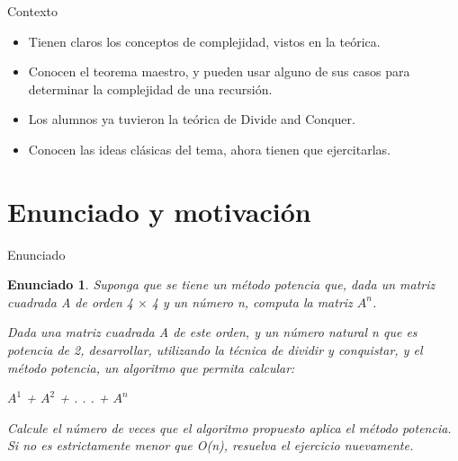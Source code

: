 \documentclass[pdf]{beamer}
\newtheorem{enun}{Enunciado}
\begin{document}
\begin{frame}{Contexto}
    \begin{itemize}
        \item{Tienen claros los conceptos de complejidad, vistos 
        en la teórica.}
        \vspace{2em}
        
        \item{Conocen el teorema maestro, y pueden usar alguno de sus casos para determinar 
        la complejidad de una recursión.}
        \vspace{2em}
        
        \item{Los alumnos ya tuvieron la teórica de Divide and Conquer. }
        \vspace{2em}
        
        \item{Conocen las ideas clásicas del tema, ahora tienen que ejercitarlas.}
        \vspace{2em}
        
    \end{itemize}
\end{frame}

\section{Enunciado y motivación}

\begin{frame}{Enunciado}

\begin{enun}
    \par{Suponga que se tiene un método potencia que, dada un matriz cuadrada A de orden 4 $\times$ 4 
    y un número n, computa la matriz $A^n$.} 
    \vspace{0.5em}
    \par{Dada una matriz cuadrada A de este orden, y un número natural n que es potencia de 2, 
    desarrollar, utilizando la técnica de dividir y conquistar, y el método potencia,
un algoritmo que permita calcular: }
    \vspace{0.5em}
    
    \begin{center}
        $A^1$ + $A^2$ + . . . + $A^n$
    \end{center}

    \vspace{0.5em}
    
    \par{Calcule el número de veces que el algoritmo propuesto aplica el método potencia. Si no es estrictamente menor que O(n), 
resuelva el ejercicio nuevamente.}
\end{enun}

\end{frame}
\end{document}
